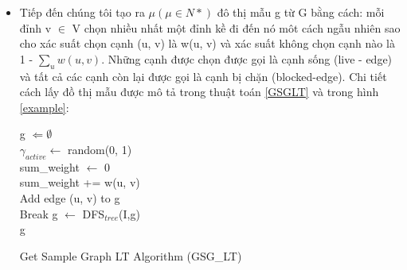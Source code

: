 \begin {itemize}
\item Tiếp đến chúng tôi tạo ra $\mu(\mu \in N*)$ đô thị mẫu g từ G bằng cách: mỗi đỉnh v $\in$ V chọn nhiều nhất một đỉnh kề đi đến nó môt cách ngẫu nhiên sao cho xác suất chọn cạnh (u, v) là w(u, v) và xác suất không chọn cạnh nào là 1 - $\sum_{u} w(u, v)$. Những cạnh được chọn được gọi là cạnh sống  (live - edge) và tất cả các cạnh còn lại được gọi là cạnh bị chặn (blocked-edge). Chi tiết cách lấy đồ thị mẫu được mô tả trong thuật toán \ref{GSGLT} và trong hình \ref{example}:
\begin{algorithm}
	g $\Leftarrow \emptyset$
	\\
	{	
		$\gamma_{active} \leftarrow$ random(0, 1)
		\\
		sum\_weight $\leftarrow$ 0
		\\
		{
			sum\_weight += w(u, v)
			\\
			{
				Add edge (u, v) to g
				\\
				Break
			}
		}
	}		
	g $\leftarrow$ DFS$_{tree}$(I,g)
	\\
	\Return g
	\caption{Get Sample Graph LT Algorithm (GSG\_{LT})}
	\label{GSGLT}
\end{algorithm}	
\begin{figure}[h]
	\hfill
	\hfill

\end{figure}
\end{itemize}
